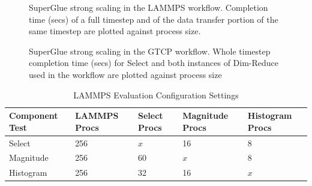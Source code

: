 \begin{figure}
  \centering
  \vspace{-0.25in}
  
  \vspace{-0.15in}
  
  \vspace{-0.17in}
  
  \vspace{-0.05in}
  \caption{SuperGlue strong scaling in the LAMMPS workflow.
    Completion time (secs) of a full timestep and of the data transfer
    portion of the same timestep are plotted against process size.}
  \label{fig:lammps-strong}
  \vspace{-0.18in}
\end{figure}

\begin{figure}
  \centering
  \vspace{-0.17in}
  
  \vspace{-0.17in}
  
  \vspace{-0.06in}
  \caption{SuperGlue strong scaling in the GTCP workflow. Whole timestep
    completion time (secs) for Select and both instances of Dim-Reduce used in
    the workflow are plotted against process size}
  \label{fig:gtcp-strong}
  \vspace{-0.25in}
\end{figure}

  

\begin{table}[tbp]
\centering
\caption{LAMMPS Evaluation Configuration Settings}
\label{tab:eval-strong-lammps}
\vspace{-0.15in}
\begin{tabular}{|l|l|l|l|l|}
\hline
Component Test & LAMMPS Procs & Select Procs & Magnitude Procs & Histogram Procs \\
\hline
Select & 256 & $x$ & 16 & 8\\
\hline
Magnitude & 256 & 60 & $x$ & 8\\
\hline
Histogram & 256 & 32 & 16 & $x$\\
\hline
\end{tabular}
\end{table}


